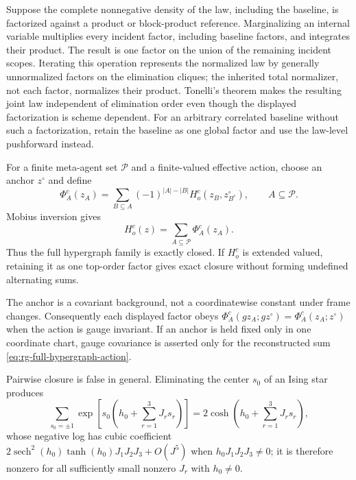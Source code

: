 Suppose the complete nonnegative density of the law, including the baseline,
is factorized against a product or block-product reference.  Marginalizing an
internal variable multiplies every incident factor, including baseline
factors, and integrates their product.  The result is one factor on the union
of the remaining incident scopes.  Iterating this operation represents the
normalized law by generally unnormalized factors on the elimination cliques;
the inherited total normalizer, not each factor, normalizes their product.
Tonelli's theorem makes the resulting joint law independent of elimination
order even though the displayed factorization is scheme dependent.  For an
arbitrary correlated baseline
without such a factorization, retain the baseline as one global factor and use
the law-level pushforward instead.  

For a finite meta-agent set $\mathcal P$ and a finite-valued effective action,
choose an anchor $z^\circ$ and define
\begin{equation}
\Phi_A^c(z_A)
=\sum_{B\subseteq A}(-1)^{|A|-|B|}
H_o^c(z_B,z_{B^c}^\circ),
\qquad A\subseteq\mathcal P.
\label{eq:rg-mobius-potentials}
\end{equation}
Mobius inversion gives
\begin{equation}
H_o^c(z)=\sum_{A\subseteq\mathcal P}\Phi_A^c(z_A).
\label{eq:rg-full-hypergraph-action}
\end{equation}
Thus the full hypergraph family is exactly closed.  If $H_o^c$ is extended
valued, retaining it as one top-order factor gives exact closure without
forming undefined alternating sums.  

The anchor is a covariant background, not a coordinatewise constant under
frame changes.  Consequently each displayed factor obeys
$\Phi_A^c(gz_A;gz^\circ)=\Phi_A^c(z_A;z^\circ)$ when the action is
gauge invariant.  If an anchor is held fixed only in one coordinate chart,
gauge covariance is asserted only for the reconstructed sum
\eqref{eq:rg-full-hypergraph-action}.  

Pairwise closure is false in general.  Eliminating the center $s_0$ of an
Ising star produces
\begin{equation}
\sum_{s_0=\pm1}\exp\left[s_0\left(h_0+\sum_{r=1}^3J_rs_r\right)\right]
=2\cosh\left(h_0+\sum_{r=1}^3J_rs_r\right),
\label{eq:rg-hidden-star-factor}
\end{equation}
whose negative log has cubic coefficient
$2\operatorname{sech}^2(h_0)\tanh(h_0)J_1J_2J_3+O(J^5)$ when
$h_0J_1J_2J_3\ne0$; it is therefore nonzero for all sufficiently small
nonzero $J_r$ with $h_0\ne0$.  

